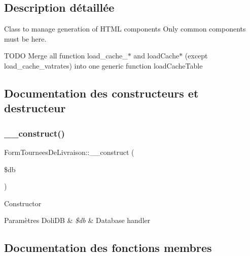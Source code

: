 \subsection{Description détaillée}
Class to manage generation of H\+T\+ML components Only common components must be here.

T\+O\+DO Merge all function load\+\_\+cache\+\_\+$\ast$ and load\+Cache$\ast$ (except load\+\_\+cache\+\_\+vatrates) into one generic function load\+Cache\+Table 

\subsection{Documentation des constructeurs et destructeur}
\mbox{\label{classFormTourneesDeLivraison_ab571c9fb5c80eed632b903160ec6ca07}} 
\subsubsection{\texorpdfstring{\+\_\+\+\_\+construct()}{\_\_construct()}}
{\footnotesize\ttfamily Form\+Tournees\+De\+Livraison\+::\+\_\+\+\_\+construct (\begin{DoxyParamCaption}\item[{}]{\$db }\end{DoxyParamCaption})}

Constructor


\begin{DoxyParams}[1]{Paramètres}
Doli\+DB & {\em \$db} & Database handler \\
\hline
\end{DoxyParams}


\subsection{Documentation des fonctions membres}
\mbox{\label{classFormTourneesDeLivraison_a6995f384af7f1508980011374e90cc6c}} 
